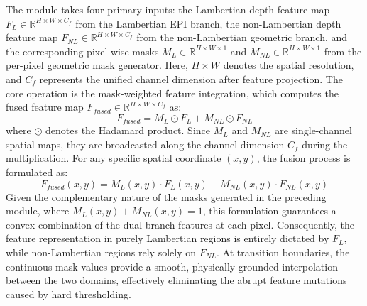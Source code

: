 \documentclass[lettersize,journal]{IEEEtran}
\begin{document}
The module takes four primary inputs: the Lambertian depth feature map $F_L \in \mathbb{R}^{H \times W \times C_f}$ from the Lambertian EPI branch, the non-Lambertian depth feature map $F_{NL} \in \mathbb{R}^{H \times W \times C_f}$ from the non-Lambertian geometric branch, and the corresponding pixel-wise masks $M_L \in \mathbb{R}^{H \times W \times 1}$ and $M_{NL} \in \mathbb{R}^{H \times W \times 1}$ from the per-pixel geometric mask generator. Here, $H \times W$ denotes the spatial resolution, and $C_f$ represents the unified channel dimension after feature projection. The core operation is the mask-weighted feature integration, which computes the fused feature map $F_{fused} \in \mathbb{R}^{H \times W \times C_f}$ as:
\begin{equation}
F_{fused} = M_L \odot F_L + M_{NL} \odot F_{NL}
\end{equation}
where $\odot$ denotes the Hadamard product. Since $M_L$ and $M_{NL}$ are single-channel spatial maps, they are broadcasted along the channel dimension $C_f$ during the multiplication. For any specific spatial coordinate $(x, y)$, the fusion process is formulated as:
\begin{equation}
F_{fused}(x,y) = M_L(x,y) \cdot F_L(x,y) + M_{NL}(x,y) \cdot F_{NL}(x,y)
\end{equation}
Given the complementary nature of the masks generated in the preceding module, where $M_L(x,y) + M_{NL}(x,y) = 1$, this formulation guarantees a convex combination of the dual-branch features at each pixel. Consequently, the feature representation in purely Lambertian regions is entirely dictated by $F_L$, while non-Lambertian regions rely solely on $F_{NL}$. At transition boundaries, the continuous mask values provide a smooth, physically grounded interpolation between the two domains, effectively eliminating the abrupt feature mutations caused by hard thresholding.
\end{document}
